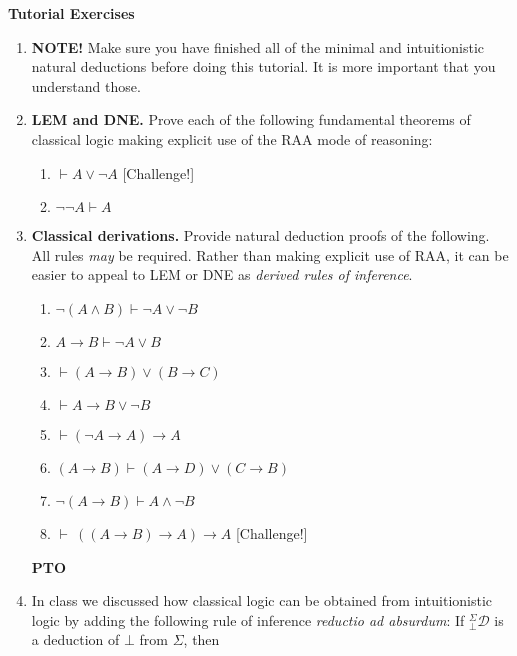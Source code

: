 \documentclass[11pt]{report}
\begin{document}
\newpage
{\bf Tutorial Exercises}
\begin{enumerate}

	\item \textbf{NOTE!} Make sure you have finished all of the minimal and intuitionistic natural deductions before doing this tutorial. It is more important that you understand those.
	
	\item \textbf{LEM and DNE.} Prove each of the following fundamental theorems of classical logic making explicit use of the RAA mode of reasoning: 
	
	\begin{enumerate}
		\item $\vdash A \lor \neg A$ \hfill [Challenge!]
		\item $\neg\neg A \vdash A$ 
	\end{enumerate}
	
	\item \textbf{Classical derivations.} Provide natural deduction proofs of the following. All rules \emph{may} be required. Rather than making explicit use of RAA, it can be easier to appeal to LEM or DNE as \emph{derived rules of inference}. 
	
	\begin{enumerate}
		\item $\neg( A \land  B) \vdash  \neg  A \lor \neg  B$ 
		\item $ A \to  B \vdash  \neg  A \lor  B$ 
		\item $\vdash  ( A \to  B) \lor ( B \to  C)$ 
		\item \(\vdash   A\to B\lor\neg B\)  
		\item $\vdash (\neg A\to A)\to A$ 
		\item $( A \to  B) \vdash ( A \rightarrow  D) \lor ( C \rightarrow  B)$ 
		\item $\lnot ( A \to  B) \vdash  A \land \lnot B$ 
		\item $\vdash \ ((A \to B) \to A) \to A$ \hfill [Challenge!]
	\end{enumerate}
	
	\vfill
	\hfill \textbf{PTO}
	\newpage
	
	\item In class we discussed how classical logic can be obtained from intuitionistic logic by adding the following rule of inference \emph{reductio ad absurdum}: If $^{\Sigma}_{\bot}\mathcal{D}$ is a deduction of $\bot$ from $\Sigma$, then
	

\end{enumerate}
\end{document}
